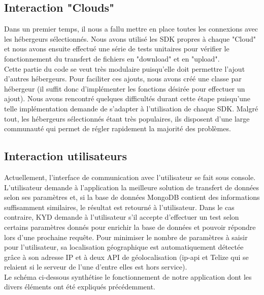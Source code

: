 \documentclass[10pt]{article}
\begin{document}
\subsection{Interaction "Clouds"}

Dans un premier temps, il nous a fallu mettre en place toutes les connexions avec les hébergeurs sélectionnés. Nous avons utilisé les SDK propres à chaque "Cloud" et nous avons ensuite effectué une série de tests unitaires pour vérifier le fonctionnement du transfert de fichiers en "download" et en "upload".\\

Cette partie du code se veut très modulaire puisqu'elle doit permettre l'ajout d'autres hébergeurs. Pour faciliter ces ajouts, nous avons créé une classe par hébergeur (il suffit donc d'implémenter les fonctions désirée pour effectuer un ajout). Nous avons rencontré quelques difficultés durant cette étape puisqu'une telle implémentation demande de s'adapter à l'utilisation de chaque SDK. Malgré tout, les hébergeurs sélectionnés étant très populaires, ils disposent d'une large communauté qui permet de régler rapidement la majorité des problèmes.

\subsection{Interaction utilisateurs}

Actuellement, l'interface de communication avec l'utilisateur se fait sous console. L'utilisateur demande à l'application la meilleure solution de transfert de données selon ses paramètres et, si la base de données MongoDB contient des informations suffisamment similaires, le résultat est retourné à l'utilisateur. Dans le cas contraire, KYD demande à l'utilisateur s'il accepte d'effectuer un test selon certains paramètres donnés pour enrichir la base de données et pouvoir répondre lors d'une prochaine requête. Pour minimiser le nombre de paramètres à saisir pour l'utilisateur, sa localisation géographique est automatiquement détectée grâce à son adresse IP et à deux API de géolocalisation (ip-api et Telize qui se relaient si le serveur de l'une d'entre elles est hors service).\\

Le schéma ci-dessous synthétise le fonctionnement de notre application dont les divers éléments ont été expliqués précédemment.
\end{document}
